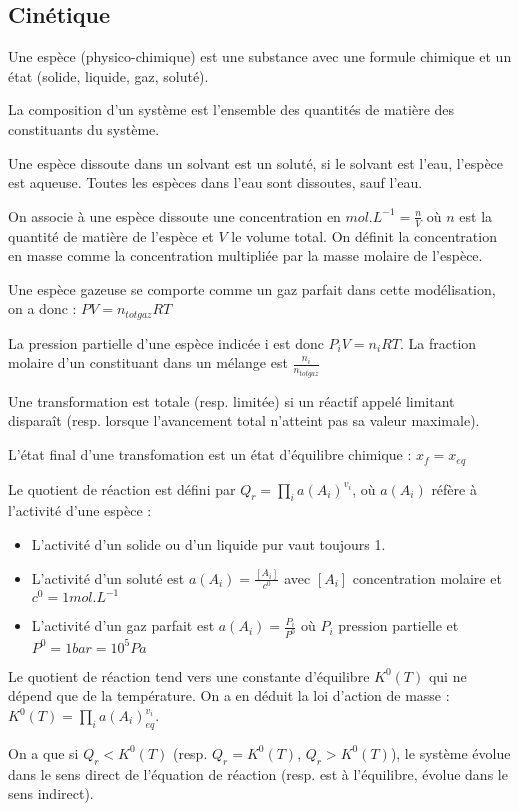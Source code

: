 \documentclass[a4paper,12pt]{book}
\newcommand{\Def}[2]{\begin{tcolorbox}[colback=white,colframe=red!10!green!20!blue!75!, title=Définition : #1]#2\end{tcolorbox}}
\newcommand{\Thr}[2]{\begin{tcolorbox}[sharp corners, colback=white,colframe=red!10!blue!30!green!75!, title=Théorème : #1]#2\end{tcolorbox}}
\begin{document}
\subsection{Cinétique}
\Def{Généralités}{Une espèce (physico-chimique) est une substance avec une formule chimique et un état (solide, liquide, gaz, soluté).
\par La composition d'un système est l'ensemble des quantités de matière des constituants du système.
\par Une espèce dissoute dans un solvant est un soluté, si le solvant est l'eau, l'espèce est aqueuse. Toutes les espèces dans l'eau sont dissoutes, sauf l'eau.
\par On associe à une espèce dissoute une concentration en $mol.L^{-1} = \frac{n}{V}$ où $n$ est la quantité de matière de l'espèce et $V$ le volume total. On définit la concentration en masse comme la concentration multipliée par la masse molaire de l'espèce.
\par Une espèce gazeuse se comporte comme un gaz parfait dans cette modélisation, on a donc : $PV = n_{totgaz}RT$
\par La pression partielle d'une espèce indicée i est donc $P_i V=n_iRT$. La fraction molaire d'un constituant dans un mélange est $\frac{n_i}{n_{totgaz}}$
\par Une transformation est totale (resp. limitée) si un réactif appelé limitant disparaît (resp. lorsque l'avancement total n'atteint pas sa valeur maximale).
\par L'état final d'une transfomation est un état d'équilibre chimique : $x_f = x_{eq}$ 
}
\Thr{Evolution chimique}{Le quotient de réaction est défini par $Q_r = \prod\limits_{i} a(A_i)^{v_i}$, où $a(A_i)$ réfère à l'activité d'une espèce :\begin{itemize}
\item L'activité d'un solide ou d'un liquide pur vaut toujours 1.
\item L'activité d'un soluté est $a(A_i) = \frac{[A_i]}{c^0}$ avec $[A_i]$ concentration molaire et $c^0 = 1 mol.L^{-1}$
\item L'activité d'un gaz parfait est $a(A_i) = \frac{P_i}{P^0}$ où $P_i$ pression partielle et $P^0 = 1 bar = 10^5 Pa$
\end{itemize}
Le quotient de réaction tend vers une constante d'équilibre $K^0(T)$ qui ne dépend que de la température. On a en déduit la loi d'action de masse : $K^0(T)=\prod\limits_{i}a(A_i)_{eq}^{v_i}$.
\par On a que si $Q_r<K^0(T)$ (resp. $Q_r=K^0(T)$, $Q_r>K^0(T)$), le système évolue dans le sens direct de l'équation de réaction (resp. est à l'équilibre, évolue dans le sens indirect).
}
\end{document}
